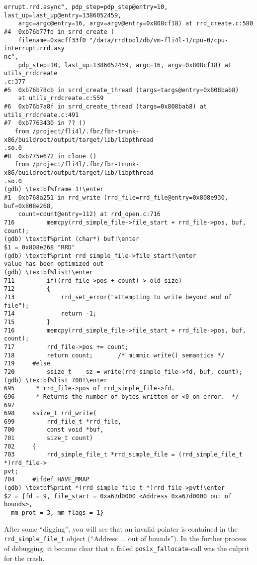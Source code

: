 \begin{example}
\begin{Verbatim}[commandchars=\\\%!]
errupt.rrd.async", pdp_step=pdp_step@entry=10, last_up=last_up@entry=1386052459,
    argc=argc@entry=16, argv=argv@entry=0x808cf18) at rrd_create.c:580
#4  0xb76b77fd in srrd_create (
    filename=0xacff33f0 "/data/rrdtool/db/vm-fli4l-1/cpu-0/cpu-interrupt.rrd.asy
nc",
    pdp_step=10, last_up=1386052459, argc=16, argv=0x808cf18) at utils_rrdcreate
.c:377
#5  0xb76b78cb in srrd_create_thread (targs=targs@entry=0x808bab8)
    at utils_rrdcreate.c:559
#6  0xb76b7a8f in srrd_create_thread (targs=0x808bab8) at utils_rrdcreate.c:491
#7  0xb7763430 in ?? ()
   from /project/fli4l/.fbr/fbr-trunk-x86/buildroot/output/target/lib/libpthread
.so.0
#8  0xb775e672 in clone ()
   from /project/fli4l/.fbr/fbr-trunk-x86/buildroot/output/target/lib/libpthread
.so.0
(gdb) \textbf%frame 1!\enter
#1  0xb768a251 in rrd_write (rrd_file=rrd_file@entry=0x808e930, buf=0x808e268,
    count=count@entry=112) at rrd_open.c:716
716         memcpy(rrd_simple_file->file_start + rrd_file->pos, buf, count);
(gdb) \textbf%print (char*) buf!\enter
$1 = 0x808e268 "RRD"
(gdb) \textbf%print rrd_simple_file->file_start!\enter
value has been optimized out
(gdb) \textbf%list!\enter
711         if((rrd_file->pos + count) > old_size)
712         {
713             rrd_set_error("attempting to write beyond end of file");
714             return -1;
715         }
716         memcpy(rrd_simple_file->file_start + rrd_file->pos, buf, count);
717         rrd_file->pos += count;
718         return count;       /* mimmic write() semantics */
719     #else
720         ssize_t   _sz = write(rrd_simple_file->fd, buf, count);
(gdb) \textbf%list 700!\enter
695      * rrd_file->pos of rrd_simple_file->fd.
696      * Returns the number of bytes written or <0 on error.  */
697
698     ssize_t rrd_write(
699         rrd_file_t *rrd_file,
700         const void *buf,
701         size_t count)
702     {
703         rrd_simple_file_t *rrd_simple_file = (rrd_simple_file_t *)rrd_file->
pvt;
704     #ifdef HAVE_MMAP
(gdb) \textbf%print *(rrd_simple_file_t *)rrd_file->pvt!\enter
$2 = {fd = 9, file_start = 0xa67d0000 <Address 0xa67d0000 out of bounds>,
  mm_prot = 3, mm_flags = 1}
\end{Verbatim}
\end{example}

After some ``digging'', you will see that an invalid pointer is contained in
the \texttt{rrd\_simple\_file\_t} object (``Address ... out of bounds'').
In the further process of debugging, it became clear that a failed
\texttt{posix\_fallocate}-call  was the culprit for the crash.

